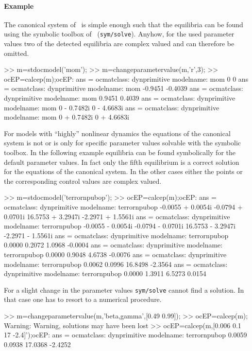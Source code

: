 \paragraph{Example}
The canonical system of \MoM\ is simple enough such that the equilibria can be found using the symbolic toolbox of \MATL\ (\lstinline+sym/solve+). Anyhow, for the used parameter values two of the detected equilibria are complex valued and can therefore be omitted.
\begin{matlab}
>> m=stdocmodel('mom');
>> m=changeparametervalue(m,'r',3);
>> ocEP=calcep(m);ocEP{:}
ans =
ocmatclass: dynprimitive
modelname: mom
     0
     0
ans =
ocmatclass: dynprimitive
modelname: mom
   -0.9451
   -0.4039
ans =
ocmatclass: dynprimitive
modelname: mom
    0.9451
    0.4039
ans =
ocmatclass: dynprimitive
modelname: mom
        0 - 0.7482i
        0 - 4.6683i
ans =
ocmatclass: dynprimitive
modelname: mom
        0 + 0.7482i
        0 + 4.6683i
\end{matlab}
For models with ``highly'' nonlinear dynamics the equations of the canonical system is not or is only for specific parameter values solvable with the symbolic toolbox. In the following example equilibria can be found symbolically for the default parameter values. In fact only the fifth equilibrium is a correct solution for the equations of the canonical system. In the other cases either the points or the corresponding control values are complex valued.
\begin{matlab}
>> m=stdocmodel('terrornpubop');
>> ocEP=calcep(m);ocEP{:}
ans =
ocmatclass: dynprimitive
modelname: terrornpubop
  -0.0055 + 0.0054i
  -0.0794 + 0.0701i
  16.5753 + 3.2947i
  -2.2971 + 1.5561i
ans =
ocmatclass: dynprimitive
modelname: terrornpubop
  -0.0055 - 0.0054i
  -0.0794 - 0.0701i
  16.5753 - 3.2947i
  -2.2971 - 1.5561i
ans =
ocmatclass: dynprimitive
modelname: terrornpubop
    0.0000
    0.2072
    1.0968
   -0.0004
ans =
ocmatclass: dynprimitive
modelname: terrornpubop
    0.0000
    0.9048
    4.6738
   -0.0076
ans =
ocmatclass: dynprimitive
modelname: terrornpubop
    0.0062
    0.0996
   16.8498
   -2.3564
ans =
ocmatclass: dynprimitive
modelname: terrornpubop
    0.0000
    1.3911
    6.5273
    0.0154
\end{matlab}
For a slight change in the parameter values \lstinline+sym/solve+ cannot find a solution. In that case one has to resort to a numerical procedure.
\begin{matlab}
>> m=changeparametervalue(m,'beta,gamma',[0.49 0.99]);
>> ocEP=calcep(m);
Warning: Warning, solutions may have been lost
>> ocEP=calcep(m,[0.006 0.1 17 -2.4]');ocEP{:}
ans =
ocmatclass: dynprimitive
modelname: terrornpubop
    0.0059
    0.0938
   17.0368
   -2.4252
\end{matlab}

